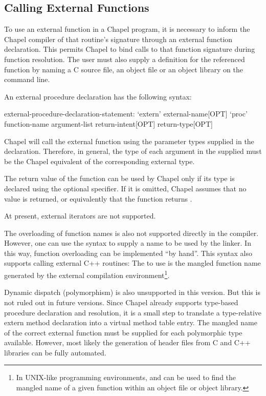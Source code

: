 \subsection{Calling External Functions}
\label{Calling_External_Functions}

To use an external function in a Chapel program, it is necessary to inform the
Chapel compiler of that routine's signature through an external function
declaration.  This permits Chapel to bind calls to that function signature
during function resolution.  The user must also supply a definition for the
referenced function by naming a C source file, an object file or an object
library on the  command line. 

An external procedure declaration has the following syntax:
\begin{syntax}
external-procedure-declaration-statement:
  `extern' external-name[OPT] `proc' function-name argument-list return-intent[OPT] return-type[OPT]
\end{syntax}

Chapel will call the external function using the parameter types supplied in
the  declaration.  Therefore, in general, the type of each argument
in the supplied  must be the Chapel equivalent of the
corresponding external type.  

The return value of the function can be used by Chapel only if its type is
declared using the optional  specifier.  If it is omitted,
Chapel assumes that no value is returned, or equivalently that the function
returns .

At present, external iterators are not supported.  

\begin{future}
The overloading of function names is
also not supported directly in the compiler.  However, one can use
the  syntax to supply a name to be used by the linker.  In
this way, function overloading can be implemented ``by hand''.  This syntax also
supports calling external C++ routines: The  to use is the
mangled function name generated by the external compilation
environment\footnote{In UNIX-like programming environments,  and 
can be used to find the mangled name of a given function within an object file
or object library.}.
\end{future}

\begin{future}
Dynamic dispatch (polymorphism) is also unsupported in this version.  But this
is not ruled out in future versions.  Since Chapel already supports type-based
procedure declaration and resolution, it is a small step to translate a
type-relative extern method declaration into a virtual method table entry.  The
mangled name of the correct external function must be supplied for each
polymorphic type available.  However, most likely the generation of 
header files from C and C++ libraries can be fully automated.
\end{future}

